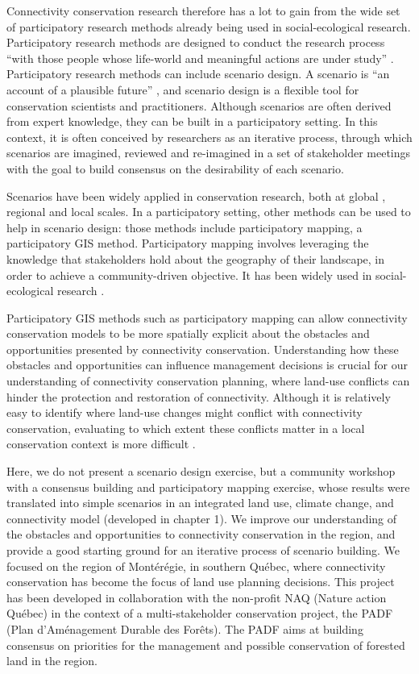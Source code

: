 Connectivity conservation research therefore has a lot to gain from the wide set of participatory research methods already being used in social-ecological research. Participatory research methods are designed to conduct the research process “with those people whose life-world and meaningful actions are under study” \citep{bergold_participatory_2012}. Participatory research methods can include scenario design. A scenario is “an account of a plausible future” \citep{peterson_scenario_2003}, and scenario design is a flexible tool for conservation scientists and practitioners. Although scenarios are often derived from expert knowledge, they can be built in a participatory setting. In this context, it is often conceived by researchers as an iterative process, through which scenarios are imagined, reviewed and re-imagined in a set of stakeholder meetings with the goal to build consensus on the desirability of each scenario. 

Scenarios have been widely applied in conservation research, both at global \citep{tscharntke_global_2012, brussaard_reconciling_2010}, regional and local \citep{carlson_scenario_2011, delevaux_scenario_2018} scales. In a participatory setting, other methods can be used to help in scenario design: those methods include participatory mapping, a participatory GIS method. Participatory mapping involves leveraging the knowledge that stakeholders hold about the geography of their landscape, in order to achieve a community-driven objective. It has been widely used in social-ecological research \citep{plieninger_assessing_2013, lynam_review_2007}. 

Participatory GIS methods such as participatory mapping can allow connectivity conservation models to be more spatially explicit about the obstacles and opportunities presented by connectivity conservation. Understanding how these obstacles and opportunities can influence management decisions is crucial for our understanding of connectivity conservation planning, where land-use conflicts can hinder the protection and restoration of connectivity. Although it is relatively easy to identify where land-use changes might conflict with connectivity conservation, evaluating to which extent these conflicts matter in a local conservation context is more difficult \cite{mitchell_monteregie_2015}.

Here, we do not present a scenario design exercise, but a community workshop with a consensus building and participatory mapping exercise, whose results were translated into simple scenarios in an integrated land use, climate change, and connectivity model (developed in chapter 1). We improve our understanding of the obstacles and opportunities to connectivity conservation in the region, and provide a good starting ground for an iterative process of scenario building. We focused on the region of Montérégie, in southern Québec, where connectivity conservation has become the focus of land use planning decisions. This project has been developed in collaboration with the non-profit NAQ (Nature action Québec) in the context of a multi-stakeholder conservation project, the PADF (Plan d’Aménagement Durable des Forêts). The PADF aims at building consensus on priorities for the management and possible conservation of forested land in the region.

